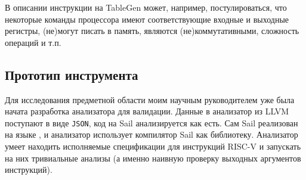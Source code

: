 В описании инструкции на TableGen может, например, постулироваться, что некоторые команды процессора имеют соответствующие входные и выходные регистры, (не)могут писать в память, являются (не)коммутативными, сложность операций и т.п.

\subsection{Прототип инструмента}

Для исследования предметной области моим научным руководителем уже была начата разработка анализатора для валидации. Данные в анализатор из LLVM поступают в виде \texttt{JSON}, код на Sail анализируется как есть. Сам Sail реализован на языке \OCaml, и анализатор использует компилятор Sail как библиотеку. Анализатор умеет находить исполняемые спецификации для инструкций RISC-V и запускать на них тривиальные анализы (а именно наивную проверку выходных аргументов инструкций).







